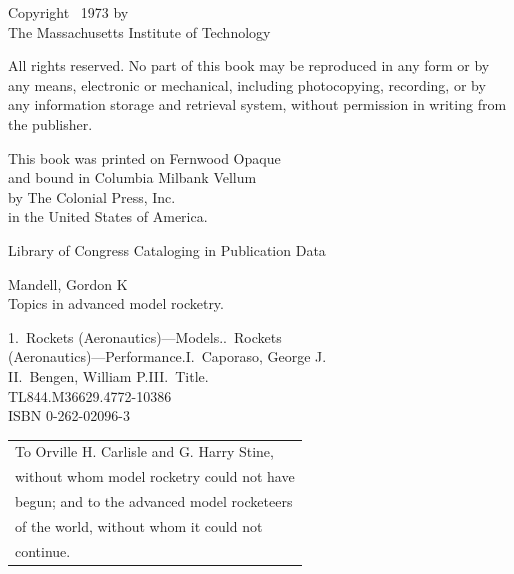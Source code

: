 \clearpage
\thispagestyle{empty}
\vspace*{\fill}
\begin{center}
\begin{minipage}{0.75\textwidth}
  \raggedright
  Copyright \textcopyright\ 1973 by\\[0.5em]
  The Massachusetts Institute of Technology

  \bigskip
  All rights reserved. No part of this book may be reproduced in any form or by any means, electronic or
  mechanical, including photocopying, recording, or by any information storage and retrieval system, without
  permission in writing from the publisher.

  \bigskip
  This book was printed on Fernwood Opaque\\[0.5em]
  and bound in Columbia Milbank Vellum\\[0.5em]
  by The Colonial Press, Inc.\\[0.5em]
  in the United States of America.

  \medskip
  Library of Congress Cataloging in Publication Data

  \medskip
  Mandell, Gordon K\\
  \hspace*{1.5em}Topics in advanced model rocketry.

  \smallskip
  \hspace*{1.5em}1.~Rockets (Aeronautics)---Models..~Rockets\\
  (Aeronautics)---Performance.\quad I.~Caporaso, George J.\\
  II.~Bengen, William P.\quad III.~Title.\\
  TL844.M36\hspace{3em}629.47\hspace{3em}72-10386\\
  ISBN 0-262-02096-3
\end{minipage}
\end{center}
\vspace*{\fill}

\clearpage
\thispagestyle{empty}
\vspace*{0.25\textheight}
\begin{center}
  \begin{tabular}{@{}l@{}}
    To Orville H. Carlisle and G. Harry Stine,\\[0.6em]
    without whom model rocketry could not have\\[0.6em]
    begun; and to the advanced model rocketeers\\[0.6em]
    of the world, without whom it could not\\[0.6em]
    continue.
  \end{tabular}
\end{center}
\vspace*{\fill}

